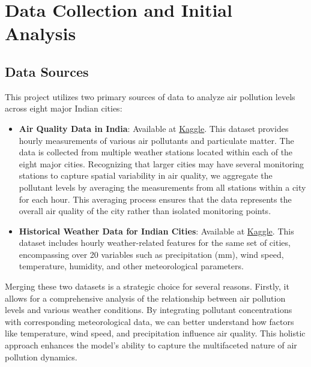 \documentclass[12pt]{article}
\begin{document}


\section{Data Collection and Initial Analysis}

\subsection{Data Sources}

This project utilizes two primary sources of data to analyze air pollution levels across eight major Indian cities:

\begin{itemize}
    \item \textbf{Air Quality Data in India}: Available at \href{https://www.kaggle.com/datasets/rohanrao/air-quality-data-in-india}{Kaggle}. This dataset provides hourly measurements of various air pollutants and particulate matter. The data is collected from multiple weather stations located within each of the eight major cities. Recognizing that larger cities may have several monitoring stations to capture spatial variability in air quality, we aggregate the pollutant levels by averaging the measurements from all stations within a city for each hour. This averaging process ensures that the data represents the overall air quality of the city rather than isolated monitoring points.

    \item \textbf{Historical Weather Data for Indian Cities}: Available at \href{https://www.kaggle.com/datasets/hiteshsoneji/historical-weather-data-for-indian-cities?fbclid=IwY2xjawGJ4RpleHRuA2FlbQIxMAABHWvTrmK5HZhuOtOFaGmaStWQzwC0LiOHtK08q87gTHdQ36p_YVT9hVDUlg_aem_A0W4rpnHatpUfV7CUXfkkA}{Kaggle}. This dataset includes hourly weather-related features for the same set of cities, encompassing over 20 variables such as precipitation (mm), wind speed, temperature, humidity, and other meteorological parameters.
\end{itemize}

Merging these two datasets is a strategic choice for several reasons. Firstly, it allows for a comprehensive analysis of the relationship between air pollution levels and various weather conditions. By integrating pollutant concentrations with corresponding meteorological data, we can better understand how factors like temperature, wind speed, and precipitation influence air quality. This holistic approach enhances the model's ability to capture the multifaceted nature of air pollution dynamics.
\end{document}
